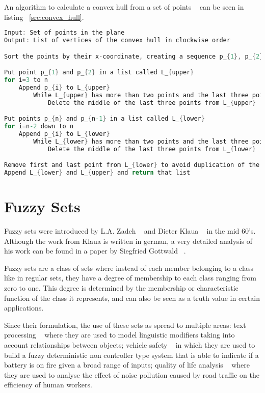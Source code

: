 An algorithm to calculate a convex hull from a set of points ~\cite{berg_computational_2008} can be seen in listing ~\ref{src:convex_hull}.

\begin{lstlisting}[float,language=C, label={src:convex_hull}, caption=Convex Hull calculation] 
Input: Set of points in the plane
Output: List of vertices of the convex hull in clockwise order

Sort the points by their x-coordinate, creating a sequence p_{1}, p_{2}, ..., p_{n}

Put point p_{1} and p_{2} in a list called L_{upper}
for i=3 to n
	Append p_{i} to L_{upper}
		While L_{upper} has more than two points and the last three points don't form a right turn
			Delete the middle of the last three points from L_{upper}

Put points p_{n} and p_{n-1} in a list called L_{lower}
for i=n-2 down to n
	Append p_{i} to L_{lower}
		While L_{lower} has more than two points and the last three points don't form a right turn
			Delete the middle of the last three points from L_{lower}

Remove first and last point from L_{lower} to avoid duplication of the points where the upper and the lower hull meet
Append L_{lower} and L_{upper} and return that list
\end{lstlisting}

\section{Fuzzy Sets}

Fuzzy sets were introduced by L.A. Zadeh ~\cite{zadeh_fuzzy_1965} and Dieter Klaua ~\cite{klaua_ansatz_1967} in the mid 60's. Although the work from Klaua is written in german, a very detailed analysis of his work can be found in a paper by Siegfried Gottwald ~\cite{gottwald_early_2010}.

Fuzzy sets are a class of sets where instead of each member belonging to a class like in regular sets, they have a degree of membership to each class ranging from zero to one. This degree is determined by the membership or characteristic function of the class it represents, and can also be seen as a truth value in certain applications. 

Since their formulation, the use of these sets as spread to multiple areas: text processing ~\cite{cock_modelling_2000} where they are used to model linguistic modifiers taking into account relationships between objects; vehicle safety ~\cite{dattathreya_detection_2012} in which they are used to build a fuzzy deterministic non controller type system that is able to indicate if a battery is on fire given a broad range of inputs; quality of life analysis ~\cite{pal_effect_2012} where they are used to analyse the effect of noise pollution caused by road traffic on the efficiency of human workers.

